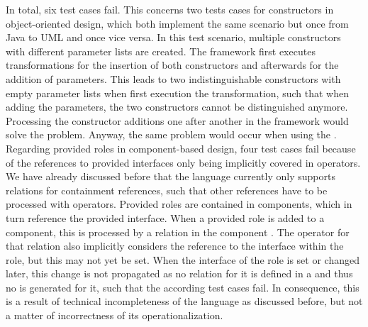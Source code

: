 In total, six test cases fail.
This concerns two tests cases for constructors in object-oriented design, which both implement the same scenario but once from Java to \gls{UML} and once vice versa.
In this test scenario, multiple constructors with different parameter lists are created.
The \vitruv framework first executes transformations for the insertion of both constructors and afterwards for the addition of parameters.
This leads to two indistinguishable constructors with empty parameter lists when first execution the transformation, such that when adding the parameters, the two constructors cannot be distinguished anymore.
Processing the constructor additions one after another in the framework would solve the problem.
Anyway, the same problem would occur when using the \reactionslanguage.
Regarding provided roles in component-based design, four test cases fail because of the references to provided interfaces only being implicitly covered in operators.
We have already discussed before that the \commonalities language currently only supports relations for containment references, such that other references have to be processed with operators.
Provided roles are contained in components, which in turn reference the provided interface.
When a provided role is added to a component, this is processed by a relation in the component \commonality.
The operator for that relation also implicitly considers the reference to the interface within the role, but this may not yet be set.
When the interface of the role is set or changed later, this change is not propagated as no relation for it is defined in a \commonality and thus no \reaction is generated for it, such that the according test cases fail.
In consequence, this is a result of technical incompleteness of the \commonalities language as discussed before, but not a matter of incorrectness of its operationalization.




